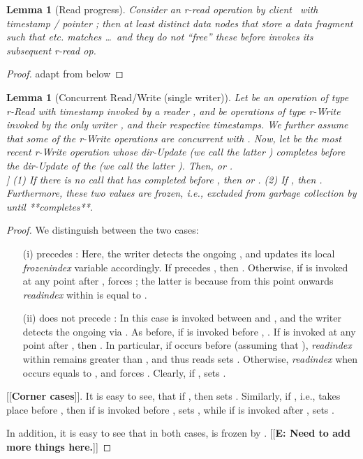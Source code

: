 \documentclass[oribibl]{llncs}
\newtheorem{lemma}[theorem]{Lemma}
\theoremstyle{definition-boldhead}
\newcommand{\var}[1]{\textit{#1}}
\newcommand{\op}[1]{\textsl{#1}}
\newcommand{\dir}{\var{dir}\xspace}
\newcommand{\nodes}{nodes\xspace}
\providecommand{\note}[1]{}
\renewcommand{\note}[1]{[[\textsf{\bf #1}]]}
\begin{document}

\begin{lemma}[Read progress]
  Consider an r-read operation by client~ with timestamp  /
  pointer ; then at least distinct  data \nodes that
  store a data fragment such that  etc. matches \dots\ and
  they do not ``free'' these before  invokes its subsequent r-read
  op.
\end{lemma}

\begin{proof}
  adapt from below
\end{proof}


\begin{lemma}[Concurrent Read/Write (single writer)]
\label{lem:concwr}
Let  be an operation of type \var{r}-\op{Read} with timestamp 
invoked by a reader , and  be operations
of type \var{r}-\op{Write} invoked by the only writer ,
and  their respective timestamps.
We further assume that some of the \var{r}-\op{Write} operations are
concurrent with . Now, let  be the most recent
\var{r}-\op{Write} operation
whose \dir-\op{Update} (we call the latter ) completes before the
\dir-\op{Update} of the  (we call the latter \updaterd).
Then,  or . \\
\note{Corner cases:} (1) If there is no  call that has completed
before \updaterd, then  or .
(2) If , then .\\
Furthermore, these two values are \emph{frozen}, i.e., excluded from garbage
collection by  until {} **completes**.

\end{lemma}

\begin{proof}
We distinguish between the two cases:
\begin{itemize}
\item[(i)] \updaterd{} precedes :
Here, the writer  detects the ongoing , and updates its local
\var{frozenindex} variable accordingly. If \scanrd{} precedes
, then . Otherwise, if
\scanrd{} is invoked at any point after , 
forces ; the latter is because from this point onwards
\var{readindex} within  is equal to .
\item[(ii)] \updaterd{} does not precede :
In this case \updaterd{} is invoked between  and ,
and the writer  detects the ongoing  via . As before,
if \scanrd is invoked before , .
If \scanrd{} is invoked at any point after , then
. In particular, if \scanrd  occurs before
 (assuming that ), \var{readindex} within
 remains greater than , and thus reads
sets . Otherwise, \var{readindex} when \scanrd occurs
equals to , and  forces
. Clearly, if ,  sets .
\end{itemize}
\note{Corner cases}. It is easy to see, that if , then  sets
. Similarly, if , i.e., \updaterd{} takes place before
, then if \scanrd is invoked before ,  sets
, while if \scanrd is invoked after ,  sets
.

In addition, it is easy to see that in both cases,  is frozen by
. \note{E: Need to add more things here.}
\end{proof}
\end{document}
